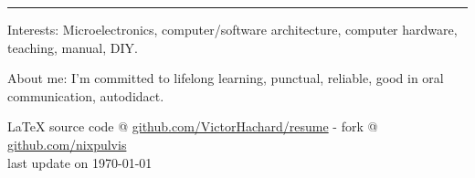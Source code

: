 \documentclass[10pt,letterpaper]{article}
\newcommand{\latex}{\LaTeX\xspace}
\newenvironment{indentsection}[1]
{\begin{list}{}
  {\setlength{\leftmargin}{#1}} \item[]
}
{\end{list}}
\begin{document}
\hrule
\begin{indentsection}{\parindent}
\begin{description*}
\item[Interests:]
  Microelectronics, computer/software architecture, computer hardware, teaching,
  manual, DIY.
\item[About me:]
  I’m committed to lifelong learning, punctual, reliable,
  good in oral communication, autodidact.
\end{description*}
\end{indentsection}


\begin{center}
\footnotesize \latex source code @
\href{http://www.github.com/VictorHachard/resume}
{github.com/VictorHachard/resume} - fork @
\href{http://www.github.com/nixpulvis}
{github.com/nixpulvis} \\
last update on \today
\end{center}
\end{document}
